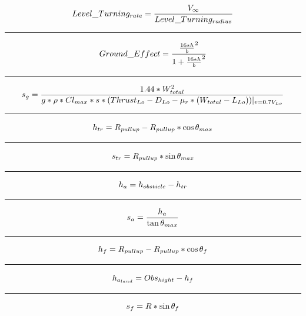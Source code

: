 \documentclass[12pt,A4paper]{article}
\begin{document}
		\begin{equation}
			Level\_Turning_{rate} = \frac{V_\infty}{Level\_Turning_{radius}} \\
		\end{equation}
		\hrule
		\vspace{0.1 in}
		\begin{equation}
			Ground\_Effect = \frac{{\frac{16 * h}{b}}^2}{1+{\frac{16 * h}{b}}^2} \\
		\end{equation}
		\hrule
		\vspace{0.1 in}
		\begin{equation}
			s_g = \frac{1.44*W_{total}^2}{g*\rho*Cl_{max}* s * {(Thrust_{Lo} - D_{Lo} - \mu_r*(W_{total}-L_{Lo}))} |_{v=0.7V_{Lo}}} \\
		\end{equation}
		\hrule
		\vspace{0.1 in}
		\begin{equation}
			h_{tr} = R_{pullup} - R_{pullup} * \cos{\theta_{max}} \\
		\end{equation}
		\hrule
		\vspace{0.1 in}
		\begin{equation}
			s_{tr} = R_{pullup} * \sin{\theta_{max}} \\
		\end{equation}
		\hrule
		\vspace{0.1 in}
		\begin{equation}
			h_a = h_{obsticle} - h_{tr} \\
		\end{equation}
		\hrule
		\vspace{0.1 in}
		\begin{equation}
			s_a = \frac{h_a}{\tan{\theta_{max}}} \\
		\end{equation}
		\hrule
		\vspace{0.1 in}
		\begin{equation}
			h_f = R_{pull up} - R_{pull up} * \cos{\theta_f}\\
		\end{equation}
		\hrule
		\vspace{0.1 in}
		\begin{equation}
			h_{a_{land}} = Obs_{hight} - h_f\\
		\end{equation}
		\hrule
		\vspace{0.1 in}
		\begin{equation}
			s_f = R * \sin{\theta_f}\\
		\end{equation}
\end{document}

